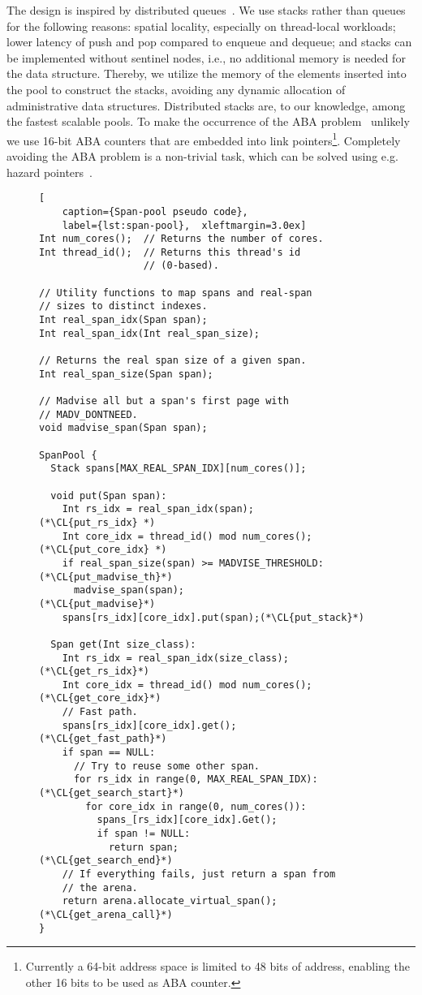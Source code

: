 \documentclass[10pt]{sigplanconf}
\newcommand{\CL}[1]{\label{code:#1}}
\begin{document}
The design is inspired by distributed queues~\cite{Haas:CF13}.  We use stacks
rather than queues for the following reasons: spatial locality, especially on
thread-local workloads; lower latency of push and pop compared to enqueue and
dequeue; and stacks can be implemented without sentinel nodes, i.e., no
additional memory is needed for the data structure. Thereby, we utilize the
memory of the elements inserted into the pool to construct the stacks, avoiding
any dynamic allocation of administrative data structures. Distributed stacks
are, to our knowledge, among the fastest scalable pools. To make the occurrence
of the ABA problem~\cite{Herlihy08} unlikely we use 16-bit ABA counters that are
embedded into link pointers\footnote{Currently a 64-bit address space is
limited to 48 bits of address, enabling the other 16 bits to be used as ABA
counter.}. Completely avoiding the ABA problem is a non-trivial task, which can
be solved using e.g. hazard pointers~\cite{Michael:IEEE04}.

\begin{figure}[t]
\begin{lstlisting}[
    caption={Span-pool pseudo code},
    label={lst:span-pool},  xleftmargin=3.0ex]
Int num_cores();  // Returns the number of cores.
Int thread_id();  // Returns this thread's id 
                  // (0-based).

// Utility functions to map spans and real-span
// sizes to distinct indexes.
Int real_span_idx(Span span);
Int real_span_idx(Int real_span_size);

// Returns the real span size of a given span.
Int real_span_size(Span span);

// Madvise all but a span's first page with
// MADV_DONTNEED.
void madvise_span(Span span);

SpanPool {
  Stack spans[MAX_REAL_SPAN_IDX][num_cores()];

  void put(Span span):
    Int rs_idx = real_span_idx(span);         (*\CL{put_rs_idx} *)
    Int core_idx = thread_id() mod num_cores(); (*\CL{put_core_idx} *)
    if real_span_size(span) >= MADVISE_THRESHOLD:(*\CL{put_madvise_th}*)
      madvise_span(span);                     (*\CL{put_madvise}*)
    spans[rs_idx][core_idx].put(span);(*\CL{put_stack}*)

  Span get(Int size_class):
    Int rs_idx = real_span_idx(size_class);   (*\CL{get_rs_idx}*)
    Int core_idx = thread_id() mod num_cores();(*\CL{get_core_idx}*)
    // Fast path.
    spans[rs_idx][core_idx].get();           (*\CL{get_fast_path}*)
    if span == NULL:
      // Try to reuse some other span.
      for rs_idx in range(0, MAX_REAL_SPAN_IDX): (*\CL{get_search_start}*)
        for core_idx in range(0, num_cores()):
          spans_[rs_idx][core_idx].Get();
          if span != NULL:
            return span;                      (*\CL{get_search_end}*)
    // If everything fails, just return a span from
    // the arena.
    return arena.allocate_virtual_span();     (*\CL{get_arena_call}*)
}
\end{lstlisting}
\end{figure}
\end{document}
